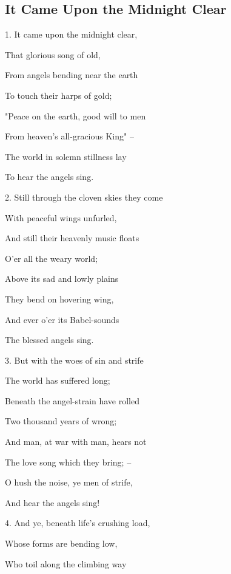 \subsection{It Came Upon the Midnight Clear}\label{midnight}
\begin{description}[nosep,leftmargin=\parindent,labelsep=0pt]
\item 1. It came upon the midnight clear, 
\item That glorious song of old, 
\item From angels bending near the earth 
\item To touch their harps of gold; 
\item "Peace on the earth, good will to men 
\item From heaven’s all-gracious King" – 
\item The world in solemn stillness lay 
\item To hear the angels sing. 
\vspace{1.5ex}
\item 2. Still through the cloven skies they come 
\item With peaceful wings unfurled, 
\item And still their heavenly music floats 
\item O'er all the weary world; 
\item Above its sad and lowly plains 
\item They bend on hovering wing, 
\item And ever o'er its Babel-sounds 
\item The blessed angels sing. 
\vspace{1.5ex}
\item 3. But with the woes of sin and strife 
\item The world has suffered long; 
\item Beneath the angel-strain have rolled 
\item Two thousand years of wrong; 
\item And man, at war with man, hears not 
\item The love song which they bring; – 
\item O hush the noise, ye men of strife, 
\item And hear the angels sing! 
\vspace{1.5ex}
\item 4. And ye, beneath life's crushing load, 
\item Whose forms are bending low, 
\item Who toil along the climbing way 

\end{description}
